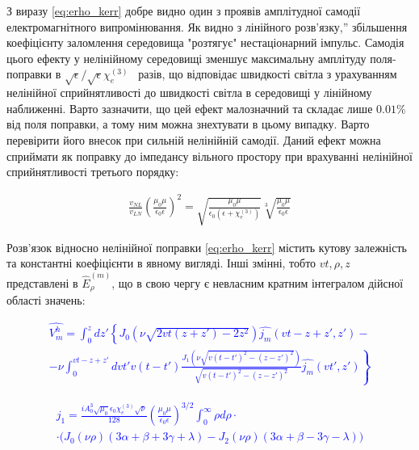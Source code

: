 З виразу \eqref{eq:erho_kerr} добре видно один з проявів амплітудної
самодії електромагнітного випромінювання. Як видно з лінійного розв'язку,''
збільшення коефіцієнту заломлення середовища "розтягує" нестаціонарний 
імпульс. Самодія цього ефекту у нелінійному середовищі зменшує 
максимальну амплітуду поля-поправки в 
$ \sqrt{\epsilon} / \sqrt{\epsilon} \chi_e^{(3)} $  разів, що відповідає 
швидкості світла з урахуванням нелінійної сприйнятливості до швидкості 
світла в середовищі у лінійному наближенні. Варто зазначити, що цей ефект 
малозначний та складає лише $ 0.01\% $ від поля поправки, а тому ним 
можна знехтувати в цьому випадку. Варто перевірити його внесок при сильній 
нелінійній самодії. Даний ефект можна сприймати як поправку до імпедансу 
вільного простору при врахуванні нелінійної сприйнятливості третього порядку:

\begin{equation*} \begin{aligned}
\frac{v_{NL}}{v_{LN}}
\left( \frac{\mu_0 \mu}{\epsilon_0 \epsilon} \right)^2 = 
\sqrt{\frac{\mu_0 \mu}{\epsilon_0 \left( \epsilon + \chi_e^{(3)} \right)}}
\sqrt[3]{\frac{\mu_0 \mu}{\epsilon_0 \epsilon}} 
\end{aligned} \end{equation*}

Розв'язок відносно нелінійної поправки \eqref{eq:erho_kerr} містить кутову 
залежність та константні коефіцієнти в явному вигляді. Інші змінні, тобто
$ vt, \rho, z $ представлені в $ \hat{E}_\rho^{(m)} $, що в свою чергу
є невласним кратним інтегралом дійсної області значень:

\textcolor{blue} { \begin{equation*} \begin{aligned}
\hat{V_m^h} = \int_0^z dz' 
\left\{ J_0 \left( \nu \sqrt{2 vt (z + z') - 2 z^2} \right) 
\hat{j_m} (vt - z + z',z') - \right. \\ 
\left. - \nu \int_0^{vt - z + z'} dvt' v (t-t') 
\frac{J_1 \left( \nu \sqrt{v(t-t')^2 - (z-z')^2} \right)}
{\sqrt{v(t-t')^2 - (z-z')^2}} \hat{j_m} (vt',z')  \right\}
\end{aligned} \end{equation*} }

\textcolor{blue} { \begin{equation*} \begin{aligned}
j_1 = \frac{i A_0^3 \sqrt{\mu_0} \epsilon_0 \chi_e^{(3)} \sqrt{\nu}}{128}
\left( \frac{\mu_0 \mu}{\epsilon_0 \epsilon} \right)^{3/2}
\int_0^\infty \rho d \rho \cdot \\ \cdot
\Big( J_0 (\nu \rho) ( 3 \alpha + \beta + 3 \gamma + \lambda) - 
J_2 (\nu \rho) ( 3 \alpha + \beta - 3 \gamma - \lambda ) \Big)
\end{aligned} \end{equation*} }

